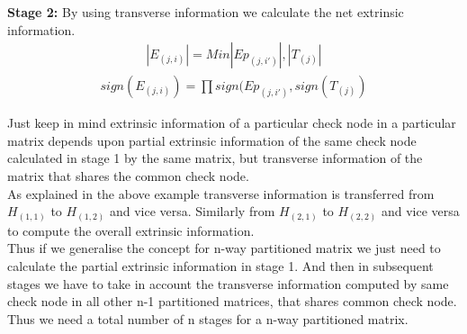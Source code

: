 \textbf{Stage 2:}
By using transverse information we calculate the net extrinsic information. 
\begin{align} |E_{(j,i)}| =  Min {|Ep_{(j,i')}| ,|T_{(j)}| }  
\end{align} 
\begin{align} sign({E_{(j,i)}}) =  \prod{sign(Ep_{(j,i')},sign(T_{(j)})  }
\end{align} 

Just keep in mind extrinsic information of a particular check node in a particular matrix depends upon partial extrinsic information of the same check node calculated in stage 1 by the same matrix, but transverse information of the matrix that shares the common check node. \\
As explained in the above example transverse information is transferred from $H_{(1,1)}$ to $H_{(1,2)}$ and vice versa. Similarly from  $H_{(2,1)}$ to $H_{(2,2)}$ and vice versa to compute the overall extrinsic information. \\

Thus if we generalise the concept for n-way partitioned matrix we just need to calculate the partial extrinsic information in stage 1. And then in subsequent stages we have to take in account the transverse information computed by same check node in all other n-1 partitioned matrices, that shares common check node. Thus we need a total number of n stages for a n-way partitioned matrix.

